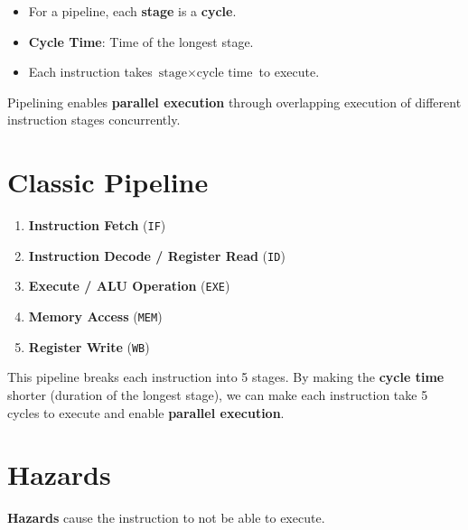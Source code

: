 \documentclass[12pt, letterpaper]{article}
\begin{document}
\begin{itemize}
  \item For a pipeline, each \textbf{stage} is a \textbf{cycle}.
  \item \textbf{Cycle Time}: Time of the longest stage.
  \item Each instruction takes $ \textrm{stage} \times \textrm{cycle
    time} $ to execute.
\end{itemize}

Pipelining enables \textbf{parallel execution} through overlapping
execution of different instruction stages concurrently.

\section*{Classic Pipeline}

\begin{enumerate}
  \item \textbf{Instruction Fetch} (\texttt{IF})
  \item \textbf{Instruction Decode / Register Read} (\texttt{ID})
  \item \textbf{Execute / ALU Operation} (\texttt{EXE})
  \item \textbf{Memory Access} (\texttt{MEM})
  \item \textbf{Register Write} (\texttt{WB})
\end{enumerate}

This pipeline breaks each instruction into 5 stages. By making the
\textbf{cycle time} shorter (duration of the longest stage), we can
make each instruction take 5 cycles to execute and enable
\textbf{parallel execution}.

\section*{Hazards}

\textbf{Hazards} cause the instruction to not be able to execute.
\end{document}

